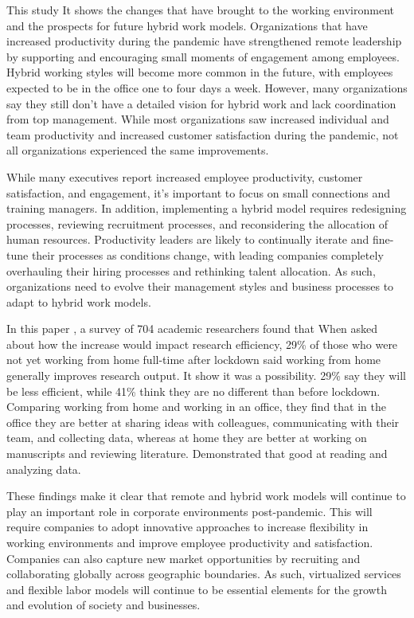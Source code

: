 \documentclass[12pt]{article}
\begin{document}
This study \cite{what_executives_say} It shows the changes that have brought to
the working environment and the prospects for future hybrid work models.
Organizations that have increased
productivity during the pandemic have strengthened remote leadership by
supporting and encouraging small moments of engagement among employees. Hybrid
working styles will become more common in the future, with employees expected
to be in the office one to four days a week. However, many organizations say
they still don't have a detailed vision for hybrid work and lack coordination
from top management. While most organizations saw increased individual and team
productivity and increased customer satisfaction during the pandemic, not all
organizations experienced the same improvements.

While many executives report increased employee productivity, customer
satisfaction, and engagement, it's important to focus on small connections and
training managers. In addition, implementing a hybrid model requires
redesigning processes, reviewing recruitment processes, and reconsidering the
allocation of human resources. Productivity leaders are likely to continually
iterate and fine-tune their processes as conditions change, with leading
companies completely overhauling their hiring processes and rethinking talent
allocation. As such, organizations need to evolve their management styles and
business processes to adapt to hybrid work models.

In this paper \cite{10.1371/journal.pone.0249127}, a survey of 704 academic
researchers found that
When asked about how the increase
would impact research efficiency, 29\% of those who were not yet working from
home full-time after lockdown said working from home generally improves
research output. It show it was a possibility. 29\% say they will be less
efficient, while 41\% think they are no different than before lockdown.
Comparing working from home and working in an office, they find that in the
office they are better at sharing ideas with colleagues, communicating with
their team, and collecting data, whereas at home they are better at working on
manuscripts and reviewing literature. Demonstrated that good at reading
and analyzing data.

These findings make it clear that remote and hybrid work models will continue
to play an important role in corporate environments post-pandemic. This will
require companies to adopt innovative approaches to increase flexibility in
working environments and improve employee productivity and satisfaction.
Companies can also capture new market opportunities by recruiting and
collaborating globally across geographic boundaries. As such, virtualized
services and flexible labor models will continue to be essential elements for
the growth and evolution of society and businesses.
\end{document}
